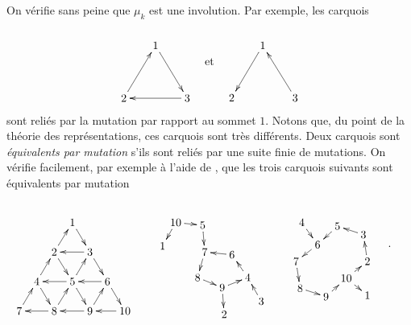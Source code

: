 \documentclass[brochure,12pt]{bourbaki}
\numberwithin{equation}{subsection}
\numberwithin{theorem}{section}
\begin{document}
On v\'erifie sans peine que $\mu_k$ est une involution. Par
exemple, les carquois
\begin{equation} \label{quiver1}
\begin{xy} 0;<0.3pt,0pt>:<0pt,-0.3pt>::
(94,0) *+{1} ="0",
(0,156) *+{2} ="1",
(188,156) *+{3} ="2",
"1", {\ar"0"},
"0", {\ar"2"},
"2", {\ar"1"},
\end{xy}
\begin{minipage}{1cm}
\vspace*{1cm}
\begin{center} et \end{center}
\end{minipage}
\begin{xy} 0;<0.3pt,0pt>:<0pt,-0.3pt>::
(92,0) *+{1} ="0",
(0,155) *+{2} ="1",
(188,155) *+{3} ="2",
"0", {\ar"1"},
"2", {\ar"0"},
\end{xy}
\end{equation}
sont reli\'es par la mutation par rapport au sommet $1$. Notons
que, du point de la th\'eorie des
repr\'esentations, ces carquois sont tr\`es diff\'erents.
Deux carquois sont {\em \'equivalents par mutation} s'ils sont reli\'es
par une suite finie de mutations.
On v\'erifie facilement, par exemple \`a l'aide de
\cite{KellerQuiverMutationApplet}, que les trois carquois suivants sont
\'equivalents par mutation
\begin{equation} \label{quiver3}
\begin{xy} 0;<0.6pt,0pt>:<0pt,-0.6pt>::
(79,0) *+{1} ="0",
(52,44) *+{2} ="1",
(105,44) *+{3} ="2",
(26,88) *+{4} ="3",
(79,88) *+{5} ="4",
(131,88) *+{6} ="5",
(0,132) *+{7} ="6",
(52,132) *+{8} ="7",
(105,132) *+{9} ="8",
(157,132) *+{10} ="9",
"1", {\ar"0"},
"0", {\ar"2"},
"2", {\ar"1"},
"3", {\ar"1"},
"1", {\ar"4"},
"4", {\ar"2"},
"2", {\ar"5"},
"4", {\ar"3"},
"6", {\ar"3"},
"3", {\ar"7"},
"5", {\ar"4"},
"7", {\ar"4"},
"4", {\ar"8"},
"8", {\ar"5"},
"5", {\ar"9"},
"7", {\ar"6"},
"8", {\ar"7"},
"9", {\ar"8"},
\end{xy}
\quad\quad
\begin{xy} 0;<0.3pt,0pt>:<0pt,-0.3pt>::
(0,70) *+{1} ="0",
(183,274) *+{2} ="1",
(293,235) *+{3} ="2",
(253,164) *+{4} ="3",
(119,8) *+{5} ="4",
(206,96) *+{6} ="5",
(125,88) *+{7} ="6",
(104,164) *+{8} ="7",
(177,194) *+{9} ="8",
(39,0) *+{10} ="9",
"9", {\ar"0"},
"8", {\ar"1"},
"2", {\ar"3"},
"3", {\ar"5"},
"8", {\ar"3"},
"4", {\ar"6"},
"9", {\ar"4"},
"5", {\ar"6"},
"6", {\ar"7"},
"7", {\ar"8"},
\end{xy}
\quad\quad
\begin{xy} 0;<0.3pt,0pt>:<0pt,-0.3pt>::
(212,217) *+{1} ="0",
(212,116) *+{2} ="1",
(200,36) *+{3} ="2",
(17,0) *+{4} ="3",
(123,11) *+{5} ="4",
(64,66) *+{6} ="5",
(0,116) *+{7} ="6",
(12,196) *+{8} ="7",
(89,221) *+{9} ="8",
(149,166) *+{10} ="9",
"9", {\ar"0"},
"1", {\ar"2"},
"9", {\ar"1"},
"2", {\ar"4"},
"3", {\ar"5"},
"4", {\ar"5"},
"5", {\ar"6"},
"6", {\ar"7"},
"7", {\ar"8"},
"8", {\ar"9"},
\end{xy}
\begin{minipage}{1cm}
\vspace*{1.5cm}
\begin{center} . \end{center}
\end{minipage}
\end{equation}
\end{document}

